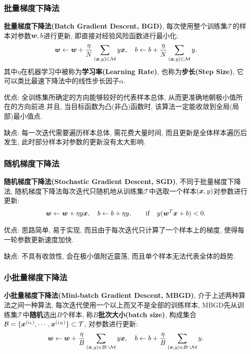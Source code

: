 \documentclass[12pt, a4paper, oneside]{ctexart}
\begin{document}
\subsubsection{批量梯度下降法}
\textbf{批量梯度下降法(Batch Gradient Descent,  BGD)}, 每次使用整个训练集$\mathcal{T}$的样本对参数$\boldsymbol{w},  b$进行更新, 即直接对经验风险函数进行最小化:
\begin{equation}
    \boldsymbol{w}\leftarrow \boldsymbol{w} + \frac{\eta}{N}\sum_{(\boldsymbol{x}, y)\in \mathcal{M}}y\boldsymbol{x}, \quad b\leftarrow b+\frac{\eta}{N}\sum_{(\boldsymbol{x}, y)\in \mathcal{M}}y.
\end{equation}
其中$\eta$在机器学习中被称为\textbf{学习率(Learning Rate)}, 也称为\textbf{步长(Step Size)}, 它可以类比最速下降法中的线性步长因子$\alpha$.

优点: 全训练集所确定的方向能够较好的代表样本总体, 从而更准确地朝极小值所在的方向前进.并且, 当目标函数为凸(非凸)函数时, 该算法一定能收敛到全局(局部)最小值点.

缺点: 每一次迭代需要遍历样本总体, 需花费大量时间, 而且更新是全体样本遍历后发生, 此时部分样本对参数的更新没有太大影响.

\subsubsection{随机梯度下降法}
\textbf{随机梯度下降法(Stochastic Gradient Descent,  SGD)}, 不同于批量梯度下降法, 随机梯度下降法每次迭代只随机地从训练集$\mathcal{T}$中选取一个样本$(\boldsymbol{x}, y)$对参数进行更新: 
\begin{equation}
    \boldsymbol{w}\leftarrow \boldsymbol{w} + \eta y\boldsymbol{x}, \quad b\leftarrow b + \eta y,\qquad \mathrm{if}\quad y(\boldsymbol{w}^T\boldsymbol{x}+b) < 0.
\end{equation}

优点: 思路简单, 易于实现, 而且由于每次迭代只计算了一个样本上的梯度, 使得每一轮参数更新速度加快.

缺点: 不具有收敛性, 会在极小值附近震荡, 而且单个样本无法代表全体的趋势.

\subsubsection{小批量梯度下降法}\label{section-小批量}
\textbf{小批量梯度下降法(Mini-batch Gradient Descent,  MBGD)}, 介于上述两种算法之间一种算法, 每次迭代使用一个以上而又不是全部的训练样本, MBGD先从训练集$\mathcal{T}$中\textbf{随机}选出$B$个样本, 称$B$\textbf{批次大小(batch size)}, 构成集合$\mathcal{B}=\{\boldsymbol{x}^{(i_1)}, \cdots, \boldsymbol{x}^{(i_B)}\}\subset \mathcal{T}$, 对参数进行更新: 
\begin{equation}
    \boldsymbol{w}\leftarrow \boldsymbol{w} + \frac{\eta}{B}\sum_{(\boldsymbol{x}, y)\in \mathcal{B}\cap \mathcal{M}}y\boldsymbol{x}, \quad 
    b\leftarrow b + \frac{\eta}{B}\sum_{(\boldsymbol{x}, y)\in \mathcal{B}\cap \mathcal{M}}y.
\end{equation}
\end{document}
